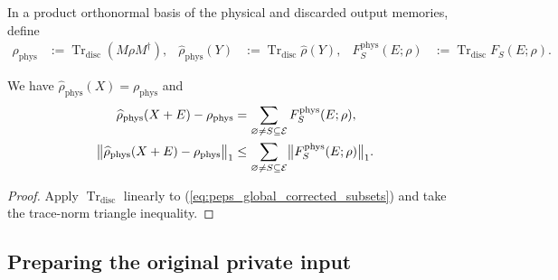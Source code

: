 \begin{definition}
    \label{def:peps_physical_source_replacement}
    \leanok
    In a product orthonormal basis of the physical and discarded output
    memories, define
    \begin{align}
        \rho_{\mathrm{phys}}            & :=\operatorname{Tr}_{\mathrm{disc}}(M\rho M^\dagger), &
        \widehat\rho_{\mathrm{phys}}(Y) & :=\operatorname{Tr}_{\mathrm{disc}}\widehat\rho(Y),   &
        F_S^{\mathrm{phys}}(E;\rho)     & :=\operatorname{Tr}_{\mathrm{disc}}F_S(E;\rho).
        \label{eq:peps_physical_source_replacement}
    \end{align}
\end{definition}
\begin{lemma}
    \label{thm:peps_physical_corrected_subsets}
    \leanok
    We have $\widehat\rho_{\mathrm{phys}}(X)=\rho_{\mathrm{phys}}$ and
    \begin{align}
        \widehat\rho_{\mathrm{phys}}(X+E)-\rho_{\mathrm{phys}}
         & =\sum_{\varnothing\ne S\subseteq\mathcal E}F_S^{\mathrm{phys}}(E;\rho),
        \label{eq:peps_physical_corrected_subsets}                                 \\
        \bigl\|\widehat\rho_{\mathrm{phys}}(X+E)-\rho_{\mathrm{phys}}\bigr\|_1
         & \leq\sum_{\varnothing\ne S\subseteq\mathcal E}
        \bigl\|F_S^{\mathrm{phys}}(E;\rho)\bigr\|_1.\notag
    \end{align}
\end{lemma}
\begin{proof}
    \leanok
    Apply $\operatorname{Tr}_{\mathrm{disc}}$ linearly to
    (\ref{eq:peps_global_corrected_subsets}) and take the trace-norm triangle
    inequality.
\end{proof}

\subsection{Preparing the original private input}

